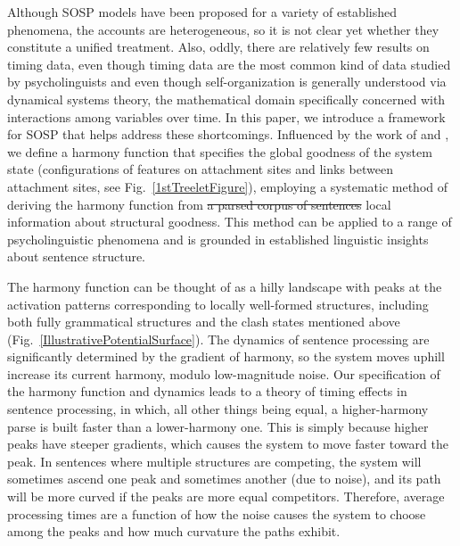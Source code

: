 \documentclass[10pt,letterpaper]{article}
\begin{document}
Although SOSP models have been proposed for a variety of established phenomena, the accounts are heterogeneous, so it is not clear yet whether they constitute a unified treatment. Also, oddly, there are relatively few results on timing data, even though timing data are the most common kind of data studied by psycholinguists and even though self-organization is generally understood via dynamical systems theory, the mathematical domain specifically concerned with interactions among variables over time. In this paper, we introduce a framework for SOSP that helps address these shortcomings. Influenced by the work of  and , we define a harmony function \cite<known in other domains as a potential or energy function>{smolensky1986information} that specifies the global goodness of the system state (configurations of features on attachment sites and links between  attachment sites, see Fig.~\ref{1stTreeletFigure}), employing a systematic method of deriving the harmony function from \sout{a parsed corpus of sentences} local information about structural goodness. This method can be applied to a range of psycholinguistic phenomena and is grounded in established linguistic insights about sentence structure. 

The harmony function can be thought of as a hilly landscape with peaks at the activation patterns corresponding to locally well-formed structures, including both fully grammatical structures and the clash states mentioned above (Fig.~\ref{IllustrativePotentialSurface}). The dynamics of sentence processing are significantly determined by the gradient of harmony, so the system moves uphill increase its current harmony, modulo low-magnitude noise. Our specification of the harmony function and dynamics leads to a theory of timing effects in sentence processing, in which, all other things being equal, a higher-harmony parse is built faster than a lower-harmony one. This is simply because higher peaks have steeper gradients, which causes the system to move faster toward the peak. In sentences where multiple structures are competing, the system will sometimes ascend one peak and sometimes another (due to noise), and its path will be more curved if the peaks are more equal competitors.  Therefore, average processing times are a function of how the noise causes the system to choose among the peaks and how much curvature the paths exhibit.%
\end{document}
